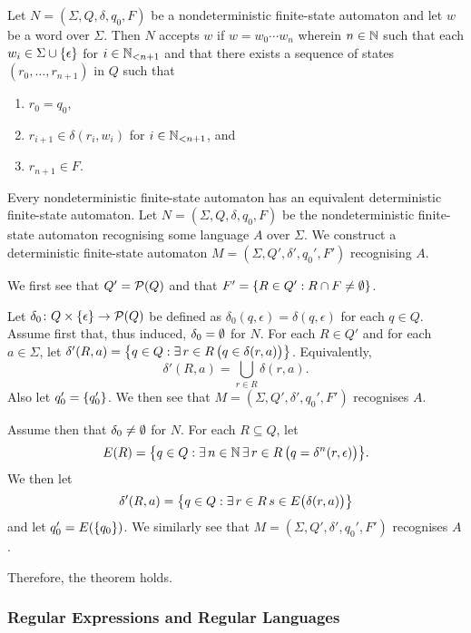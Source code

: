 Let \(N = (\Sigma, Q, \delta, q_0, F)\) be a nondeterministic finite-state
automaton and let \(w\) be a word over \(\Sigma\). Then \(N\) accepts \(w\) if
\(w = w_0 \cdots w_n\) wherein \(n \in \setnat\) such that each \(w_i \in \Sigma
\cup \set{\epsilon}\) for \(i \in \Nln[n + 1]\) and that there exists a sequence
of states \((r_0, \ldots, r_{n + 1})\) in \(Q\) such that
\begin{enumerate}
    \item \(r_0 = q_0\),
    \item \(r_{i + 1} \in \delta(r_i, w_i)\) for \(i \in \Nln[n + 1]\), and
    \item \(r_{n + 1} \in F\).
\end{enumerate}

\Bth
    \label{thm1}
    Every nondeterministic finite-state automaton has an equivalent
    deterministic finite-state automaton.
\Eth
\Bpr
    Let \(N = (\Sigma, Q, \delta, q_0, F)\) be the nondeterministic finite-state
    automaton recognising some language \(A\) over \(\Sigma\).  We construct a
    deterministic finite-state automaton \(M = (\Sigma, Q', \delta', q_0', F')\)
    recognising \(A\).

    We first see that \(Q' = \pow(Q)\) and that \(F' = \set{R \in Q' : R \cap F
    \neq \nset}\).

    Let \(\map{\delta_0}{Q \times \set{\epsilon}}{\pow(Q)}\) be defined as
    \(\delta_0(q, \epsilon) = \delta(q, \epsilon)\) for each \(q \in Q\). Assume
    first that, thus induced, \(\delta_0 = \nset\) for \(N\). For each \(R \in
    Q'\) and for each \(a \in \Sigma\), let \(\delta'(R, a) = \set*{q \in Q :
    \exists \, r \in R \, \big(q \in \delta(r, a)\big)}\). Equivalently,
    \[
        \delta'(R, a) = \bigcup_{r \in R} \delta(r, a).
    \]
    Also let \(q_0' = \set{q_0'}\). We then see that \(M = (\Sigma, Q', \delta',
    q_0', F')\) recognises \(A\).

    Assume then that \(\delta_0 \neq \nset\) for \(N\). For each \(R \subseteq Q
    \), let
    \[
        E(R) = \set*{q \in Q : \exists \, n \in \setnat \, \exists \, r \in R \,
        \big(q = \delta^n(r, \epsilon)\big)}.
    \]
    We then let
    \[
        \delta'(R, a) = \set*{q \in Q : \exists \, r \in R \, s \in
        E\big(\delta(r, a)\big)}
    \]
    and let \(q_0' = E(\set{q_0})\). We similarly see that \(M = (\Sigma, Q',
    \delta', q_0', F')\) recognises \(A\).

    Therefore, the theorem holds.
\Epr

\subsubsection{Regular Expressions and Regular Languages}

